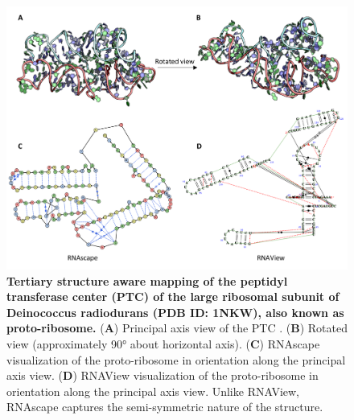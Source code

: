 \begin{center}
\begin{figure}[H]
  \includegraphics[width=\linewidth]{./rnascapefigs/figureS1.png}
    \caption[Tertiary structure aware mapping of the peptidyl transferase center (PTC) of the large ribosomal subunit of Deinococcus radiodurans (PDB ID: 1NKW), also known as proto-ribosome ]{\textbf{Tertiary structure aware mapping of the peptidyl transferase center (PTC) of the large ribosomal subunit of Deinococcus radiodurans (PDB ID: 1NKW), also known as proto-ribosome.} ({\bf A}) Principal axis view of the PTC \citep{Bose2022}. ({\bf B})  Rotated view (approximately 90° about horizontal axis). ({\bf C})  RNAscape visualization of the proto-ribosome in orientation along the principal axis view. ({\bf D})  RNAView \citep{Yang2003} visualization of the proto-ribosome in orientation along the principal axis view. Unlike RNAView, RNAscape captures the semi-symmetric nature of the structure.}
  \label{fig:rnascapeS1}
\end{figure}
\end{center}


